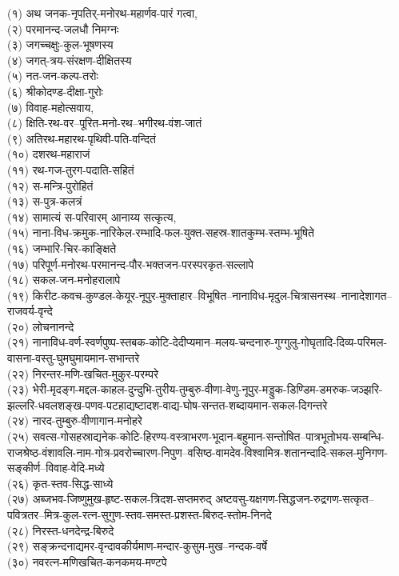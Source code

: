 
(१) अथ जनक-नृपतिर्-मनोरथ-महार्णव-पारं गत्वा,\\
(२) परमानन्द-जलधौ निमग्नः\\
(३) जगच्चक्षुः-कुल-भूषणस्य\\
(४) जगत्-त्रय-संरक्षण-दीक्षितस्य\\
(५) नत-जन-कल्प-तरोः\\
(६) श्रीकोदण्ड-दीक्षा-गुरोः\\
(७) विवाह-महोत्सवाय,\\

(८) क्षिति-रथ-वर–पूरित-मनो-रथ–भगीरथ-वंश-जातं\\
(९) अतिरथ-महारथ-पृथिवी-पति-वन्दितं\\
(१०) दशरथ-महाराजं\\
(११) रथ-गज-तुरग-पदाति-सहितं\\
(१२) स-मन्त्रि-पुरोहितं\\
(१३) स-पुत्र-कलत्रं\\
(१४) सामात्यं स-परिवारम् आनाय्य सत्कृत्य,\\

(१५) नाना-विध-क्रमुक-नारिकेल-रम्भादि-फल-युक्त-सहस्र-शातकुम्भ-स्तम्भ-भूषिते\\
(१६) जम्भारि-चिर-काङ्क्षिते\\
(१७) परिपूर्ण-मनोरथ-परमानन्द-पौर-भक्तजन-परस्परकृत-सल्लापे\\
(१८) सकल-जन-मनोहरालापे\\

(१९) किरीट-कवच-कुण्डल-केयूर-नूपुर-मुक्ताहार–विभूषित–नानाविध-मृदुल-चित्रासनस्थ–नानादेशागत–राजवर्य-वृन्दे\\
(२०) लोचनानन्दे\\
(२१) नानाविध-वर्ण-स्वर्णपुष्प-स्तबक-कोटि-देदीप्यमान–मलय-चन्दनारु-गुग्गुलु-गोघृतादि-दिव्य-परिमल-वासना-वस्तु-घुमघुमायमान-सभान्तरे\\
(२२) निरन्तर-मणि-खचित-मुकुर-परम्परे\\
(२३) भेरी-मृदङ्ग-मद्दल-काहल-दुन्दुभि-तुरीय-तुम्बुरु-वीणा-वेणु-नूपुर-मड्डुक-डिण्डिम-डमरुक-जञ्झरि-झल्लरि-धवलशङ्ख-पणव-पटहाद्यष्टादश-वाद्य-घोष-सन्तत-शब्दायमान-सकल-दिगन्तरे\\
(२४) नारद-तुम्बुरु-वीणागान-मनोहरे\\
(२५) सवत्स-गोसहस्राद्यनेक-कोटि-हिरण्य-वस्त्राभरण-भूदान-बहुमान-सन्तोषित–पात्रभूतोभय-सम्बन्धि-राजश्रेष्ठ-वंशावलि-नाम-गोत्र-प्रवरोच्चारण-निपुण–वसिष्ठ-वामदेव-विश्वामित्र-शतानन्दादि-सकल-मुनिगण-सङ्कीर्ण–विवाह-वेदि-मध्ये\\

(२६) कृत-स्तव-सिद्ध-साध्ये\\
(२७) अब्जभव-जिष्णुमुख-हृष्ट-सकल-त्रिदश-सप्तमरुद् अष्टवसु-यक्षगण-सिद्धजन-रुद्रगण-सत्कृत–पवित्रतर–मित्र-कुल-रत्न-सुगुण-स्तव-समस्त-प्रशस्त-बिरुद-स्तोम-निनदे\\
(२८) निरस्त-धनदेन्द्र-बिरुदे\\
(२९) सङ्क्रन्दनाद्यमर-वृन्दावकीर्यमाण-मन्दार-कुसुम-मुख–नन्दक-वर्षे\\
(३०) नवरत्न-मणिखचित-कनकमय-मण्टपे\\

